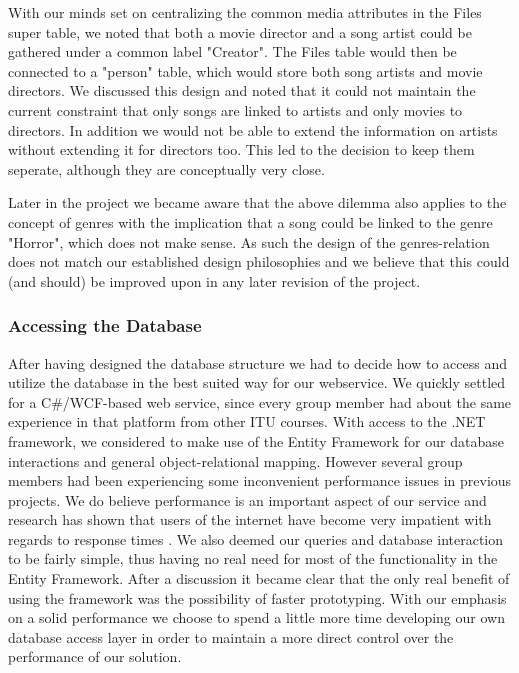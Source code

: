 With our minds set on centralizing the common media attributes in the Files super table, we noted that both a movie director and a song artist could be gathered under a common label "Creator". The Files table would then be connected to a "person" table, which would store both song artists and movie directors.
We discussed this design and noted that it could not maintain the current constraint that only songs are linked to artists and only movies to directors. In addition we would not be able to extend the information on artists without extending it for directors too. This led to the decision to keep them seperate, although they are conceptually very close.

Later in the project we became aware that the above dilemma also applies to the concept of genres with the implication that a song could be linked to the genre "Horror", which does not make sense. As such the design of the genres-relation does not match our established design philosophies and we believe that this could (and should) be improved upon in any later revision of the project.

\subsubsection{Accessing the Database}
\label{sec:databaseaccess}
After having designed the database structure we had to decide how to access and utilize the database in the best suited way for our webservice. We quickly settled for a C\#/WCF-based web service, since every group member had about the same experience in that platform from other ITU courses.
With access to the .NET framework, we considered to make use of the Entity Framework for our database interactions and general object-relational mapping. However several group members had been experiencing some inconvenient performance issues in previous projects. We do believe performance is an important aspect of our service and research has shown that users of the internet have become very impatient with regards to response times \cite{webusersflee}. We also deemed our queries and database interaction to be fairly simple, thus having no real need for most of the functionality in the Entity Framework. After a discussion it became clear that the only real benefit of using the framework was the possibility of faster prototyping. With our emphasis on a solid performance we choose to spend a little more time developing our own database access layer in order to maintain a more direct control over the performance of our solution.


